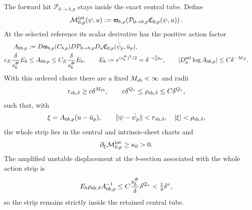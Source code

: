 \begin{proposition}
The forward hit \(\mathcal P_{0\to b,p}\) stays inside the exact central
tube.  Define
\begin{equation}
 \mathcal M_{0,p}^{\rm int}(\psi,u)
 :=\mathfrak m_{b,p}\!\left(
   \mathcal P_{0\to b,p}\mathfrak C_{0,p}(\psi,u)\right).          \label{eq:anchor-main-intrinsic-membership}
\end{equation}
At the selected reference its scalar derivative has the positive
 action factor
\begin{align}
 A_{0b,p}
 &:=D\mathfrak m_{b,p}(C_{b,p})
       D\mathcal P_{0\to b,p}
       D_u\mathfrak C_{0,p}(\bar\psi_p,\bar u_p),\notag\\
 c_E\frac{\delta}{s_b^\#}E_b
 &\le A_{0b,p}\le C_E\frac{\delta}{s_b^\#}E_b,\qquad
 E_b:=e^{(s_b^\#)^2/2}=\delta^{-c_b^2p_o},\qquad
 |D_p^{\rm sel}\log A_{0b,p}|\le C\delta^{-M_A}.     \label{eq:anchor-main-projective-action}
\end{align}
With this ordered choice there are a fixed
\(M_{\rm sh}<\infty\) and radii
\begin{equation}
 r_{{\rm sh},\delta}\ge c\delta^{M_{\rm sh}},\qquad
 c\delta^{Q_*}\le\rho_{{\rm sh},\delta}
 \le C\delta^{Q_*},                                  \label{eq:anchor-main-shooting-radii}
\end{equation}
such that, with
\begin{equation}
 \xi=A_{0b,p}(u-\bar u_p),\qquad
 \|\psi-\bar\psi_p\|<r_{{\rm sh},\delta},\quad
 |\xi|<\rho_{{\rm sh},\delta},                       \label{eq:anchor-finite-shooting-strip}
\end{equation}
the whole strip lies in the central and intrinsic-sheet charts and
\begin{equation}
 \partial_\xi\mathcal M_{0,p}^{\rm int}\ge\kappa_0>0. \label{eq:anchor-finite-shooting-orientation}
\end{equation}
The amplified unstable displacement at the \(b\)-section associated with the
whole action strip is
\begin{equation}
 E_b\rho_{{\rm sh},\delta}A_{0b,p}^{-1}
 \le C\frac{s_b^\#}{\delta}\delta^{Q_*}
 <\tfrac14\delta^\kappa,                            \label{eq:anchor-main-action-strip-containment}
\end{equation}
so the strip remains strictly inside the retained central tube.


\end{proposition}
